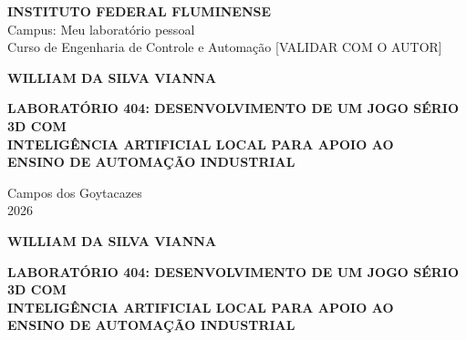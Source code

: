 
\frontmatter

\begin{center}
  \textbf{INSTITUTO FEDERAL FLUMINENSE}\\[2pt]
  Campus: Meu laboratório pessoal\\
  Curso de Engenharia de Controle e Automação [VALIDAR COM O AUTOR]
\end{center}

\vspace{2.5cm}

\begin{center}
  \textbf{WILLIAM DA SILVA VIANNA}
\end{center}

\vspace{3.0cm}

\begin{center}
  \textbf{LABORATÓRIO 404: DESENVOLVIMENTO DE UM JOGO SÉRIO 3D COM\\
  INTELIGÊNCIA ARTIFICIAL LOCAL PARA APOIO AO\\ ENSINO DE AUTOMAÇÃO INDUSTRIAL}
\end{center}

\vfill

\begin{center}
  Campos dos Goytacazes\\
  2026
\end{center}

\newpage

\begin{center}
  \textbf{WILLIAM DA SILVA VIANNA}
\end{center}

\vspace{2.5cm}

\begin{center}
  \textbf{LABORATÓRIO 404: DESENVOLVIMENTO DE UM JOGO SÉRIO 3D COM\\
  INTELIGÊNCIA ARTIFICIAL LOCAL PARA APOIO AO\\ ENSINO DE AUTOMAÇÃO INDUSTRIAL}
\end{center}

